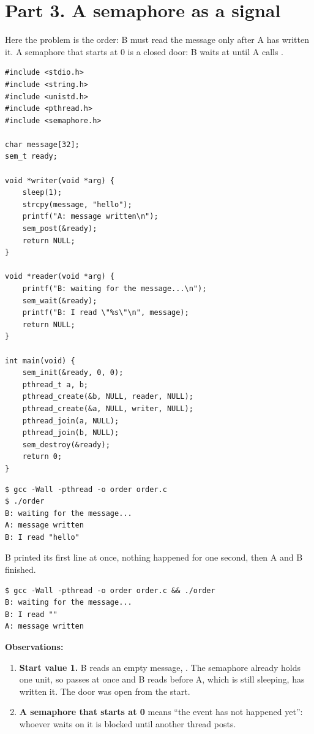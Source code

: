 \documentclass[11pt,a4paper]{article}
\begin{document}
\section{Part 3. A semaphore as a signal}

Here the problem is the order: B must read the message only after A has written it. A semaphore
that starts at 0 is a closed door: B waits at  until A calls .

\begin{lstlisting}[style=ccode,caption={order.c}]
#include <stdio.h>
#include <string.h>
#include <unistd.h>
#include <pthread.h>
#include <semaphore.h>

char message[32];
sem_t ready;

void *writer(void *arg) {
    sleep(1);
    strcpy(message, "hello");
    printf("A: message written\n");
    sem_post(&ready);
    return NULL;
}

void *reader(void *arg) {
    printf("B: waiting for the message...\n");
    sem_wait(&ready);
    printf("B: I read \"%s\"\n", message);
    return NULL;
}

int main(void) {
    sem_init(&ready, 0, 0);
    pthread_t a, b;
    pthread_create(&b, NULL, reader, NULL);
    pthread_create(&a, NULL, writer, NULL);
    pthread_join(a, NULL);
    pthread_join(b, NULL);
    sem_destroy(&ready);
    return 0;
}
\end{lstlisting}

\begin{lstlisting}[caption={order with the semaphore starting at 0}]
$ gcc -Wall -pthread -o order order.c
$ ./order
B: waiting for the message...
A: message written
B: I read "hello"
\end{lstlisting}

B printed its first line at once, nothing happened for one second, then A and B finished.

\begin{lstlisting}[caption={order with sem\_init(\&ready, 0, 1)}]
$ gcc -Wall -pthread -o order order.c && ./order
B: waiting for the message...
B: I read ""
A: message written
\end{lstlisting}

\textbf{Observations:}
\begin{enumerate}
  \item \textbf{Start value 1.} B reads an empty message, . The semaphore
  already holds one unit, so  passes at once and B reads  before
  A, which is still sleeping, has written it. The door was open from the start.
  \item \textbf{A semaphore that starts at 0} means ``the event has not happened yet'': whoever
  waits on it is blocked until another thread posts.
\end{enumerate}
\end{document}
